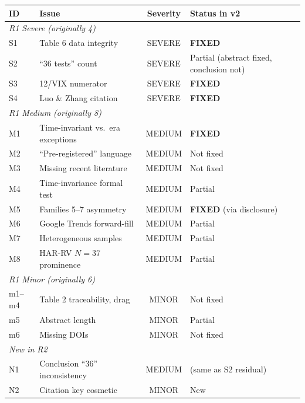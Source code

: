 \documentclass[12pt,a4paper]{article}
\begin{document}
\begin{tabular}{@{}llcl@{}}
\toprule
ID & Issue & Severity & Status in v2 \\
\midrule
\multicolumn{4}{l}{\textit{R1 Severe (originally 4)}} \\
S1 & Table 6 data integrity & SEVERE & \textcolor{fixedblue}{\textbf{FIXED}} \\
S2 & ``36 tests'' count & SEVERE & \textcolor{warncolor}{Partial} (abstract fixed, conclusion not) \\
S3 & 12/VIX numerator & SEVERE & \textcolor{fixedblue}{\textbf{FIXED}} \\
S4 & Luo \& Zhang citation & SEVERE & \textcolor{fixedblue}{\textbf{FIXED}} \\[0.5em]
\multicolumn{4}{l}{\textit{R1 Medium (originally 8)}} \\
M1 & Time-invariant vs.\ era exceptions & MEDIUM & \textcolor{fixedblue}{\textbf{FIXED}} \\
M2 & ``Pre-registered'' language & MEDIUM & \textcolor{warncolor}{Not fixed} \\
M3 & Missing recent literature & MEDIUM & \textcolor{warncolor}{Not fixed} \\
M4 & Time-invariance formal test & MEDIUM & \textcolor{warncolor}{Partial} \\
M5 & Families 5--7 asymmetry & MEDIUM & \textcolor{fixedblue}{\textbf{FIXED}} (via disclosure) \\
M6 & Google Trends forward-fill & MEDIUM & \textcolor{warncolor}{Partial} \\
M7 & Heterogeneous samples & MEDIUM & \textcolor{warncolor}{Partial} \\
M8 & HAR-RV $N=37$ prominence & MEDIUM & \textcolor{warncolor}{Partial} \\[0.5em]
\multicolumn{4}{l}{\textit{R1 Minor (originally 6)}} \\
m1--m4 & Table 2 traceability, drag & MINOR & Not fixed \\
m5 & Abstract length & MINOR & Partial \\
m6 & Missing DOIs & MINOR & Not fixed \\[0.5em]
\multicolumn{4}{l}{\textit{New in R2}} \\
N1 & Conclusion ``36'' inconsistency & MEDIUM & (same as S2 residual) \\
N2 & Citation key cosmetic & MINOR & New \\
\bottomrule
\end{tabular}


\end{document}
